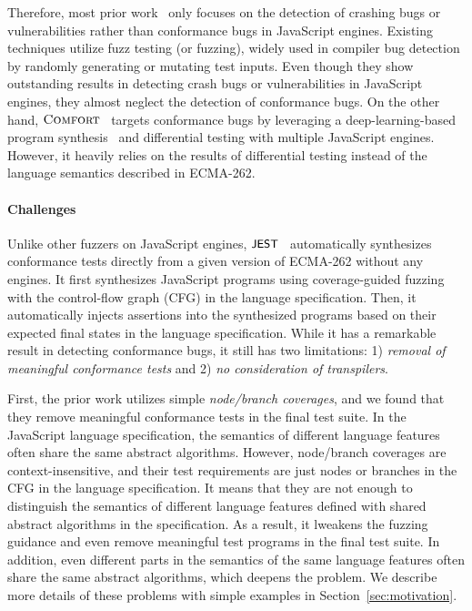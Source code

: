 
Therefore, most prior work~\cite{montage, langfuzz, die, favocado,
codealchemist, sofi} only focuses on the detection of crashing bugs or
vulnerabilities rather than conformance bugs in JavaScript engines.
%
Existing techniques utilize fuzz testing (or fuzzing), widely used in compiler
bug detection by randomly generating or mutating test inputs.
%
Even though they show outstanding results in detecting crash bugs or
vulnerabilities in JavaScript engines, they almost neglect the detection of
conformance bugs.
%
On the other hand, $\textsc{Comfort}$~\cite{comfort} targets conformance bugs by
leveraging a deep-learning-based program synthesis~\cite{deep-smith} and
differential testing with multiple JavaScript engines.
%
However, it heavily relies on the results of differential testing instead of the
language semantics described in ECMA-262.


\paragraph{\textbf{Challenges}}
%
Unlike other fuzzers on JavaScript engines, $\textsf{\small JEST}$~\cite{jest} automatically
synthesizes conformance tests directly from a given version of ECMA-262 without
any engines.
%
It first synthesizes JavaScript programs using coverage-guided
fuzzing~\cite{afl} with the control-flow graph (CFG) in the language
specification. 
%
Then, it automatically injects assertions into the synthesized programs based on
their expected final states in the language specification.
%
While it has a remarkable result in detecting conformance bugs, it still has two
limitations: 1) \textit{removal of meaningful conformance tests} and 2)
\textit{no consideration of transpilers}.


First, the prior work utilizes simple \textit{node/branch coverages}, and we
found that they remove meaningful conformance tests in the final test suite.
%
In the JavaScript language specification, the semantics of different language
features often share the same abstract algorithms.
%
However, node/branch coverages are context-insensitive, and their test
requirements are just nodes or branches in the CFG in the language
specification.
%
It means that they are not enough to distinguish the semantics of different
language features defined with shared abstract algorithms in the specification.
%
As a result, it lweakens the fuzzing guidance and even remove meaningful test
programs in the final test suite.
%
In addition, even different parts in the semantics of the same language features
often share the same abstract algorithms, which deepens the problem.
%
We describe more details of these problems with simple examples in
Section~\ref{sec:motivation}.

